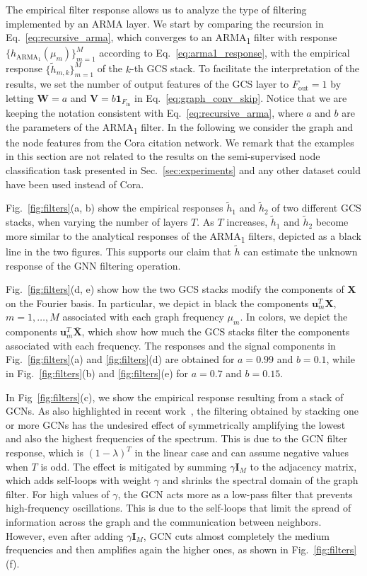 \documentclass{article}
\def\u{{\mathbf u}}
\def\X{{\mathbf X}}
\def\W{{\mathbf W}}
\def\V{{\mathbf V}}
\def\I{{\mathbf I}}
\begin{document}
The empirical filter response allows us to analyze the type of filtering implemented by an ARMA layer.
We start by comparing the recursion in Eq.~\eqref{eq:recursive_arma}, which converges to an ARMA\textsubscript{1} filter with response $\{ h_{\text{ARMA}_1}(\mu_m) \}_{m=1}^M$ according to Eq.~\eqref{eq:arma1_response}, with the empirical response $\{ \tilde{h}_{m,k} \}_{m=1}^M$ of the $k$-th GCS stack.
To facilitate the interpretation of the results, we set the number of output features of the GCS layer to $F_\text{out} = 1$ by letting $\W = a$ and $\V = b\boldsymbol{1}_{F_\text{in}}$ in Eq.~\eqref{eq:graph_conv_skip}.
Notice that we are keeping the notation consistent with Eq.~\eqref{eq:recursive_arma}, where $a$ and $b$ are the parameters of the ARMA\textsubscript{1} filter.
In the following we consider the graph and the node features from the Cora citation network.
We remark that the examples in this section are not related to the results on the semi-supervised node classification task presented in Sec.~\ref{sec:experiments} and any other dataset could have been used instead of Cora.

Fig.~\ref{fig:filters}(a, b) show the empirical responses $\tilde{h}_1$ and $\tilde{h}_2$ of two different GCS stacks, when varying the number of layers $T$.
As $T$ increases, $\tilde{h}_1$ and $\tilde{h}_2$ become more similar to the analytical responses of the ARMA\textsubscript{1} filters, depicted as a black line in the two figures.
This supports our claim that $\tilde{h}$ can estimate the unknown response of the GNN filtering operation.

Fig.~\ref{fig:filters}(d, e) show how the two GCS stacks modify the components of $\X$ on the Fourier basis.
In particular, we depict in black the components $\u_m^T\X$, $m=1, \dots, M$ associated with each graph frequency $\mu_m$.
In colors, we depict the components $\u_m^T \bar\X$, which show how much the GCS stacks filter the components associated with each frequency.
The responses and the signal components in Fig.~\ref{fig:filters}(a) and \ref{fig:filters}(d) are obtained for $a=0.99$ and $b=0.1$, while in Fig.~\ref{fig:filters}(b) and \ref{fig:filters}(e) for $a=0.7$ and $b=0.15$.

In Fig~\ref{fig:filters}(c), we show the empirical response resulting from a stack of GCNs.
As also highlighted in recent work~\cite{wu2019simplifying, maehara2019revisiting}, the filtering obtained by stacking one or more GCNs has the undesired effect of symmetrically amplifying the lowest and also the highest frequencies of the spectrum. 
This is due to the GCN filter response, which is $(1-\lambda)^T$ in the linear case and can assume negative values when $T$ is odd.
The effect is mitigated by summing $\gamma \I_M$ to the adjacency matrix, which adds self-loops with weight $\gamma$ and shrinks the spectral domain of the graph filter.
For high values of $\gamma$, the GCN acts more as a low-pass filter that prevents high-frequency oscillations.
This is due to the self-loops that limit the spread of information across the graph and the communication between neighbors.
However, even after adding $\gamma \I_M$, GCN cuts almost completely the medium frequencies and then amplifies again the higher ones, as shown in Fig.~\ref{fig:filters}(f).
\end{document}
